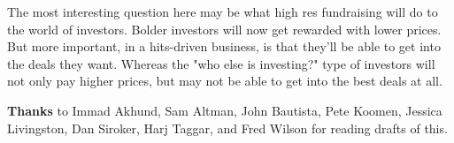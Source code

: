 The
                    most interesting question here may be what high res
                    fundraising will do to the world of investors. Bolder
                    investors will now get rewarded with lower prices. But more
                    important, in a hits-driven business, is that they'll be
                    able to get into the deals they want. Whereas the "who else
                    is investing?" type of investors will not only pay higher
                    prices, but may not be able to get into the best deals at
                    all.







\textbf{Thanks}
                    to Immad Akhund, Sam Altman, John Bautista, Pete Koomen,
                    Jessica Livingston, Dan Siroker, Harj Taggar, and Fred
                    Wilson for reading drafts of this.



              
            
          
            
              
                


                  
              
            
          
